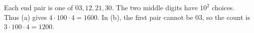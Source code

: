 Each end pair is one of $03,12,21,30$. The two middle digits have $10^2$ choices. Thus (a) gives $4\cdot100\cdot4=\boxed{1600}$. In (b), the first pair cannot be $03$, so the count is $3\cdot100\cdot4=\boxed{1200}$.
